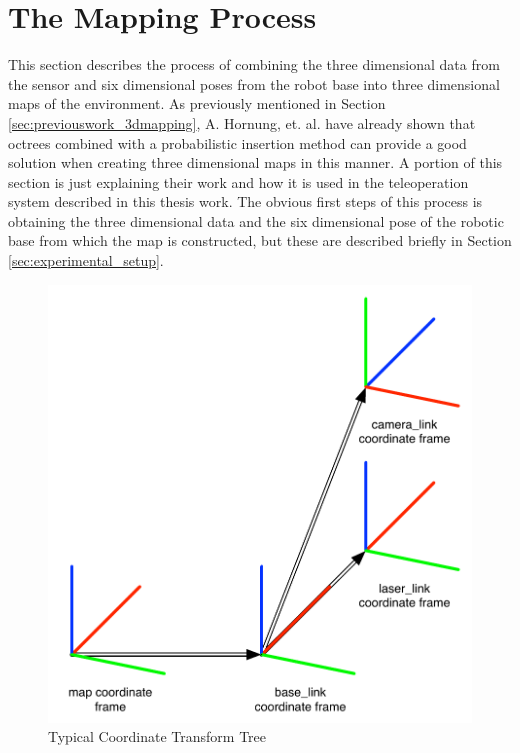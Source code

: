 \documentclass[12pt]{report}
\begin{document}
\section{The Mapping Process}
\label{sec:3dmapping}
This section describes the process of combining the three dimensional data from the sensor and six dimensional poses from the robot base into three dimensional maps of the environment. As previously mentioned in Section \ref{sec:previouswork_3dmapping}, A. Hornung, et. al. have already shown that octrees combined with a probabilistic insertion method can provide a good solution when creating three dimensional maps in this manner. A portion of this section is just explaining their work and how it is used in the teleoperation system described in this thesis work.\cite{octomap} The obvious first steps of this process is obtaining the three dimensional data and the six dimensional pose of the robotic base from which the map is constructed, but these are described briefly in Section \ref{sec:experimental_setup}.

\begin{figure}[ht]
  \centering
  \includegraphics[width=5in,keepaspectratio]{transforms.pdf}
  \caption{Typical Coordinate Transform Tree}
  \label{fig:transforms}
\end{figure}
\end{document}
